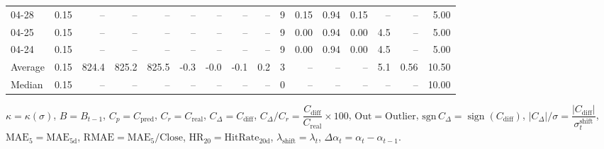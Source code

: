 \begin{threeparttable}
{\begin{tabular}{lrrrrrrrrrrrrrrr}
  04-28 &     0.15 &    -- &    -- &    -- &         -- &             -- &                       -- &                  -- &              9 &       0.15 &      0.94 &           0.15 &               -- &              -- &                   5.00 \\
  04-25 &     0.15 &    -- &    -- &    -- &         -- &             -- &                       -- &                  -- &              9 &       0.00 &      0.94 &           0.00 &              4.5 &              -- &                   5.00 \\
  04-24 &     0.15 &    -- &    -- &    -- &         -- &             -- &                       -- &                  -- &              9 &       0.00 &      0.94 &           0.00 &              4.5 &              -- &                   5.00 \\
Average &     0.15 & 824.4 & 825.2 & 825.5 &       -0.3 &           -0.0 &                     -0.1 &                 0.2 &              3 &         -- &        -- &             -- &              5.1 &            0.56 &                  10.50 \\
 Median &     0.15 &    -- &    -- &    -- &         -- &             -- &                       -- &                  -- &              0 &         -- &        -- &             -- &               -- &              -- &                  10.00 \\
\bottomrule
\end{tabular}
}
\begin{tablenotes}\footnotesize
\item $\kappa=\kappa(\sigma)$, $B=B_{t-1}$, $C_p=C_{\text{pred}}$, $C_r=C_{\text{real}}$, $C_\Delta=C_{\text{diff}}$, $C_\Delta/C_r=\dfrac{C_{\text{diff}}}{C_{\text{real}}}\times100$, $\mathrm{Out}=\text{Outlier}$, $\mathrm{sgn}\,C_\Delta=\operatorname{sign}(C_{\text{diff}})$, $|C_\Delta|/\sigma=\dfrac{|C_{\text{diff}}|}{\sigma_t^{\text{shift}}}$, $\mathrm{MAE}_5=\mathrm{MAE}_{5\text{d}}$, $\mathrm{RMAE}= \mathrm{MAE}_5 / \text{Close}$, $\mathrm{HR}_{20}=\mathrm{HitRate}_{20\text{d}}$, 
$\lambda_{\text{shift}}=\lambda_t$, 
$\Delta\alpha_t=\alpha_t-\alpha_{t-1}$.
\end{tablenotes}
\end{threeparttable}
\endgroup

